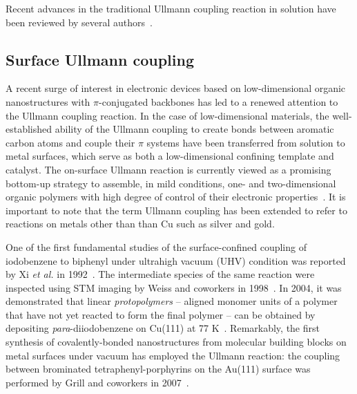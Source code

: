 \documentclass[aps,reprint,amsmath,amssymb]{revtex4-2}
\begin{document}
Recent advances in the traditional Ullmann coupling reaction in solution have been reviewed by several authors~\cite{ullmann_29,ullmann_30,ullmann_31,ullmann_32}.


\subsection{Surface Ullmann coupling}

A recent surge of interest in electronic devices based on low-dimensional organic nanostructures with $\pi$-conjugated backbones has led to a renewed attention to the Ullmann coupling reaction. 
In the case of low-dimensional materials, the well-established ability of the Ullmann coupling to create bonds between aromatic carbon atoms and couple their $\pi$ systems have been transferred from solution to metal surfaces, which serve as both a low-dimensional confining template and catalyst. 
The on-surface Ullmann reaction is currently viewed as a promising bottom-up strategy to assemble, in mild conditions, one- and two-dimensional organic polymers with high degree of control of their electronic properties~\cite{ullmann_33}. 
It is important to note that the term Ullmann coupling has been extended to refer to reactions on metals other than than Cu such as silver and gold. 

One of the first fundamental studies of the surface-confined coupling of iodobenzene to biphenyl under ultrahigh vacuum (UHV) condition was reported by Xi \textit{et al.} in 1992~\cite{sur_sci01}.
%
The intermediate species of the same reaction were inspected using STM imaging by Weiss and coworkers in 1998~\cite{langm01}.
%
In 2004, it was demonstrated that linear \emph{protopolymers} -- aligned monomer units of a polymer that have not yet reacted to form the final polymer -- can be obtained by depositing \textit{para}-diiodobenzene on Cu(111) at 77 K~\cite{jacs01}. 
%
Remarkably, the first synthesis of covalently-bonded nanostructures from molecular building blocks on metal surfaces under vacuum has employed the Ullmann reaction: the coupling between brominated tetraphenyl-porphyrins on the Au(111) surface was performed by Grill and coworkers in 2007~\cite{Naturenano2007}.
\end{document}
